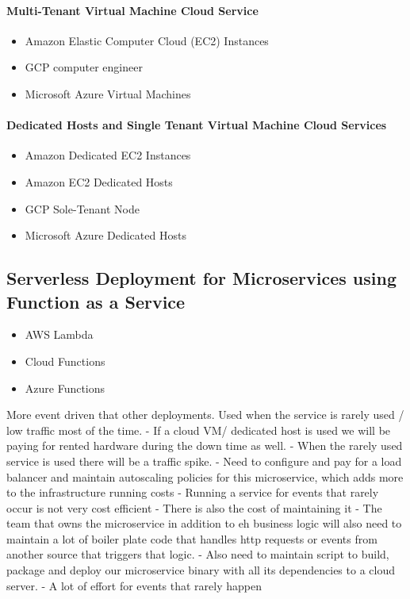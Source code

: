 \documentclass[a4paper, 11pt]{book}
\begin{document}
    \paragraph{Multi-Tenant Virtual Machine Cloud Service}
    \begin{itemize}
        \item Amazon Elastic Computer Cloud (EC2) Instances
        \item GCP computer engineer
        \item Microsoft Azure Virtual Machines
    \end{itemize}

    \paragraph{Dedicated Hosts and Single Tenant Virtual Machine Cloud Services}
    \begin{itemize}
        \item Amazon Dedicated EC2 Instances
        \item Amazon EC2 Dedicated Hosts
        \item GCP Sole-Tenant Node
        \item Microsoft Azure Dedicated Hosts
    \end{itemize}

    \subsection{Serverless Deployment for Microservices using Function as a Service}

    \begin{itemize}
        \item AWS Lambda
        \item Cloud Functions
        \item Azure Functions
    \end{itemize}

    More event driven that other deployments.
    Used when the service is rarely used / low traffic most of the time.
    - If a cloud VM/ dedicated host is used we will be paying for rented hardware during the down time as well.
    - When the rarely used service is used there will be a traffic spike.
    - Need to configure and pay for a load balancer and maintain autoscaling policies for this microservice, which adds more to the infrastructure running costs
    - Running a service for events that rarely occur is not very cost efficient
    - There is also the cost of maintaining it
    - The team that owns the microservice in addition to eh business logic will also need to maintain a lot of boiler plate code that handles http requests or events from another source that triggers that logic.
    - Also need to maintain script to build, package and deploy our microservice binary with all its dependencies to a cloud server.
    - A lot of effort for events that rarely happen
\end{document}

